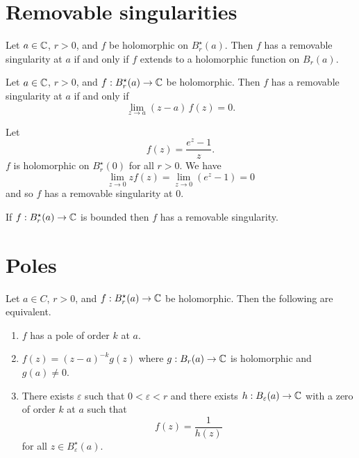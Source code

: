 \section{Removable singularities}

\begin{lemma}[]
    Let $a \in \mathbb{C}$, $r > 0$, and $f$ be holomorphic on $B_r^\star(a)$.
    Then $f$ has a removable singularity at $a$ if and only if $f$ extends to
    a holomorphic function on $B_r(a)$.
\end{lemma}

\begin{proposition}[]
    Let $a \in \mathbb{C}$, $r > 0$, and $f: B_r^\star(a) \to \mathbb{C}$ be holomorphic.
    Then $f$ has a removable singularity at $a$ if and only if
    \[
        \lim_{z \to a} (z-a) \, f(z) = 0.
    \]
\end{proposition}

\begin{example}
    Let
    \[
        f(z) = \frac{e^z - 1}{z}.
    \]
    $f$ is holomorphic on $B_r^\star(0)$ for all $r > 0$.
    We have
    \[
        \lim_{z \to 0} z f(z) 
        = \lim_{z \to 0} \left(e^z-1\right)
        = 0
    \]
    and so $f$ has a removable singularity at $0$.
\end{example}

\begin{theorem}
    If $f: B_r^\star(a) \to \mathbb{C}$ is bounded then $f$ has a removable singularity.
\end{theorem}

\section{Poles}

\begin{proposition}[]
    Let $a \in C$, $r>0$, and $f: B_r^\star(a) \to \mathbb{C}$ be holomorphic.
    Then the following are equivalent.
    \begin{enumerate}
        \item $f$ has a pole of order $k$ at $a$.
        \item $f(z) = (z-a)^{-k}g(z)$ where $g:B_r(a) \to \mathbb{C}$ is holomorphic and $g(a) \neq 0$.
        \item There exists $\varepsilon$ such that $0 < \varepsilon < r$
            and there exists $h: B_\varepsilon(a) \to \mathbb{C}$ with a zero of order $k$ at $a$
            such that 
            \[
                f(z) = \frac{1}{h(z)} 
            \]
            for all $z \in B_{\varepsilon}^\star(a)$.
    \end{enumerate}
\end{proposition}

